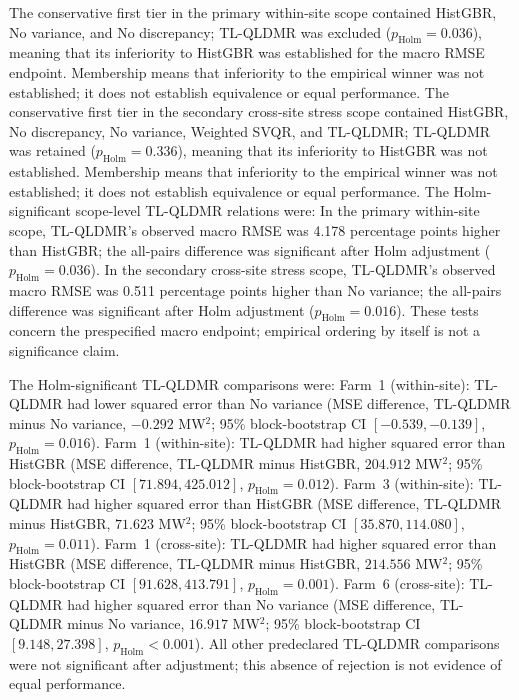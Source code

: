 {\color{blue}The conservative first tier in the primary within-site scope contained HistGBR, No variance, and No discrepancy; TL-QLDMR was excluded ($p_{\mathrm{Holm}}=0.036$), meaning that its inferiority to HistGBR was established for the macro RMSE endpoint. Membership means that inferiority to the empirical winner was not established; it does not establish equivalence or equal performance. The conservative first tier in the secondary cross-site stress scope contained HistGBR, No discrepancy, No variance, Weighted SVQR, and TL-QLDMR; TL-QLDMR was retained ($p_{\mathrm{Holm}}=0.336$), meaning that its inferiority to HistGBR was not established. Membership means that inferiority to the empirical winner was not established; it does not establish equivalence or equal performance. The Holm-significant scope-level TL-QLDMR relations were: In the primary within-site scope, TL-QLDMR's observed macro RMSE was 4.178 percentage points higher than HistGBR; the all-pairs difference was significant after Holm adjustment ($p_{\mathrm{Holm}}=0.036$). In the secondary cross-site stress scope, TL-QLDMR's observed macro RMSE was 0.511 percentage points higher than No variance; the all-pairs difference was significant after Holm adjustment ($p_{\mathrm{Holm}}=0.016$). These tests concern the prespecified macro endpoint; empirical ordering by itself is not a significance claim.}

{\color{blue}The Holm-significant TL-QLDMR comparisons were: Farm~1 (within-site): TL-QLDMR had lower squared error than No variance (MSE difference, TL-QLDMR minus No variance, $-0.292$ MW$^2$; 95\% block-bootstrap CI $[-0.539, -0.139]$, $p_{\mathrm{Holm}}=0.016$). Farm~1 (within-site): TL-QLDMR had higher squared error than HistGBR (MSE difference, TL-QLDMR minus HistGBR, $204.912$ MW$^2$; 95\% block-bootstrap CI $[71.894, 425.012]$, $p_{\mathrm{Holm}}=0.012$). Farm~3 (within-site): TL-QLDMR had higher squared error than HistGBR (MSE difference, TL-QLDMR minus HistGBR, $71.623$ MW$^2$; 95\% block-bootstrap CI $[35.870, 114.080]$, $p_{\mathrm{Holm}}=0.011$). Farm~1 (cross-site): TL-QLDMR had higher squared error than HistGBR (MSE difference, TL-QLDMR minus HistGBR, $214.556$ MW$^2$; 95\% block-bootstrap CI $[91.628, 413.791]$, $p_{\mathrm{Holm}}=0.001$). Farm~6 (cross-site): TL-QLDMR had higher squared error than No variance (MSE difference, TL-QLDMR minus No variance, $16.917$ MW$^2$; 95\% block-bootstrap CI $[9.148, 27.398]$, $p_{\mathrm{Holm}}<0.001$). All other predeclared TL-QLDMR comparisons were not significant after adjustment; this absence of rejection is not evidence of equal performance.}

